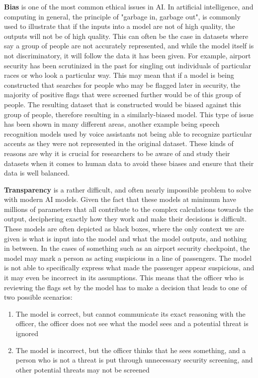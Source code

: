\textbf{Bias} is one of the most common ethical issues in AI. In artificial intelligence, and computing in general, the principle of "garbage in, garbage out", is commonly used to illustrate that if the inputs into a model are not of high quality, the outputs will not be of high quality. This can often be the case in datasets where say a group of people are not accurately represented, and while the model itself is not discriminatory, it will follow the data it has been given. For example, airport security has been scrutinized in the past for singling out individuals of particular races or who look a particular way. This may mean that if a model is being constructed that searches for people who may be flagged later in security, the majority of positive flags that were screened further would be of this group of people. The resulting dataset that is constructed would be biased against this group of people, therefore resulting in a similarly-biased model. This type of issue has been shown in many different areas, another example being speech recognition models used by voice assistants not being able to recognize particular accents as they were not represented in the original dataset. These kinds of reasons are why it is crucial for researchers to be aware of and study their datasets when it comes to human data to avoid these biases and ensure that their data is well balanced.

\textbf{Transparency} is a rather difficult, and often nearly impossible problem to solve with modern AI models. Given the fact that these models at minimum have millions of parameters that all contribute to the complex calculations towards the output, deciphering exactly how they work and make their decisions is difficult. These models are often depicted as black boxes, where the only context we are given is what is input into the model and what the model outputs, and nothing in between. In the cases of something such as an airport security checkpoint, the model may mark a person as acting suspicious in a line of passengers. The model is not able to specifically express what made the passenger appear suspicious, and it may even be incorrect in its assumptions. This means that the officer who is reviewing the flags set by the model has to make a decision that leads to one of two possible scenarios:

\begin{enumerate}
	\item The model is correct, but cannot communicate its exact reasoning with the officer, the officer does not see what the model sees and a potential threat is ignored
	\item The model is incorrect, but the officer thinks that he sees something, and a person who is not a threat is put through unnecessary security screening, and other potential threats may not be screened
\end{enumerate}

